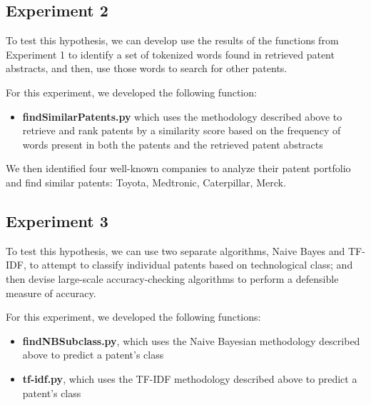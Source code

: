\documentclass{article}
\begin{document}
\subsection{Experiment 2}
\noindent{}

To test this hypothesis, we can develop use the results of the functions from Experiment 1 to identify a set of tokenized words found in retrieved patent abstracts, and then, use those words to search for other patents.

For this experiment, we developed the following function:
\begin{itemize}
  \item \textbf{findSimilarPatents.py} which uses the methodology described above to retrieve and rank patents by a similarity score based on the frequency of words present in both the patents and the retrieved patent abstracts
\end{itemize}

We then identified four well-known companies to analyze their patent portfolio and find similar patents: Toyota, Medtronic, Caterpillar, Merck.

\subsection{Experiment 3}
\noindent{}

To test this hypothesis, we can use two separate algorithms, Naive Bayes and TF-IDF, to attempt to classify individual patents based on technological class; and then devise large-scale accuracy-checking algorithms to perform a defensible measure of accuracy.

For this experiment, we developed the following functions:
\begin{itemize}
  \item \textbf{findNBSubclass.py}, which uses the Naive Bayesian methodology described above to predict a patent’s class
  \item \textbf{tf-idf.py}, which uses the TF-IDF methodology described above to predict a patent’s class
\end{itemize}
\end{document}
